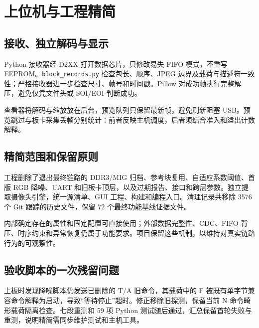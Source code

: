 \section{上位机与工程精简}
\subsection{接收、独立解码与显示}
Python 接收器经 D2XX 打开数据芯片，只修改易失 FIFO 模式，不重写 EEPROM。\texttt{block\_records.py} 检查包长、顺序、JPEG 边界及载荷与描述符一致性；严格接收器进一步检查尺寸、帧号和时间戳。Pillow 对成功帧执行完整解压，避免仅凭文件头或 SOI/EOI 判断成功。

查看器将解码与缩放放在后台，预览队列只保留最新帧，避免刷新阻塞 USB。预览跳过与板卡采集丢帧分别统计：前者反映主机调度，后者须结合准入和溢出计数解释。

\subsection{精简范围和保留原则}
工程删除了退出最终链路的 DDR3/MIG 归档、参考块复用、自适应系数阈值、首版 RGB 降噪、UART 和旧板卡顶层，以及过期报告、接口和跨层参数。独立提取摄像头引擎，统一源清单、GUI 工程、构建和编程入口。清理记录共移除 3576 个 Git 跟踪的历史文件，保留 72 个最终功能基线证据文件。

内部确定存在的属性和固定配置可直接使用；外部数据完整性、CDC、FIFO 背压、时序约束和异常恢复仍属于功能要求。项目保留这些机制，以维持对真实链路行为的可观察性。

\subsection{验收脚本的一次残留问题}
上板时发现降噪脚本仍发送已删除的 T/A 旧命令，其载荷中的 F 被既有单字节兼容命令解释为启动，导致“等待停止”超时。修正移除旧探测，保留当前 N 命令畸形载荷隔离检查。七段重测和 59 项 Python 测试随后通过，汇总保留首轮失败与重测，说明精简需同步维护测试和主机工具。
\clearpage
